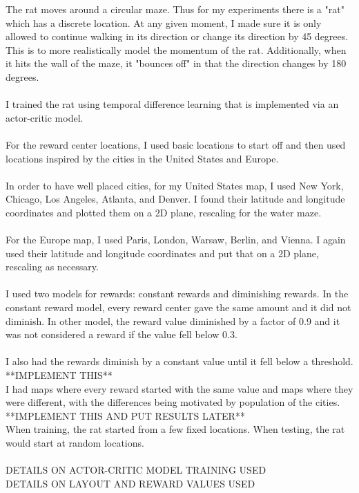 \documentclass[conference]{IEEEtran}
\begin{document}
The rat moves around a circular maze. Thus for my experiments there is a "rat" which has a discrete location. At any given moment, I made sure it is only allowed to continue walking in its direction or change its direction by 45 degrees. This is to more realistically model the momentum of the rat. Additionally, when it hits the wall of the maze, it "bounces off" in that the direction changes by 180 degrees.\\
\\
I trained the rat using temporal difference learning that is implemented via an actor-critic model. \\
\\
For the reward center locations, I used basic locations to start off and then used locations inspired by the cities in the United States and Europe. \\
\\
In order to have well placed cities, for my United States map, I used New York, Chicago, Los Angeles, Atlanta, and Denver. I found their latitude and longitude coordinates and plotted them on a 2D plane, rescaling for the water maze. \\
\\
For the Europe map, I used Paris, London, Warsaw, Berlin, and Vienna. I again used their latitude and longitude coordinates and put that on a 2D plane, rescaling as necessary. \\
\\
I used two models for rewards: constant rewards and diminishing rewards. In the constant reward model, every reward center gave the same amount and it did not diminish. In other model, the reward value diminished by a factor of 0.9 and it was not considered a reward if the value fell below 0.3. \\
\\
I also had the rewards diminish by a constant value until it fell below a threshold. **IMPLEMENT THIS**
\\
I had maps where every reward started with the same value and maps where they were different, with the differences being motivated by population of the cities. **IMPLEMENT THIS AND PUT RESULTS LATER**
\\
When training, the rat started from a few fixed locations. When testing, the rat would start at random locations. \\
\\
DETAILS ON ACTOR-CRITIC MODEL TRAINING USED\\
DETAILS ON LAYOUT AND REWARD VALUES USED\\
\end{document}
